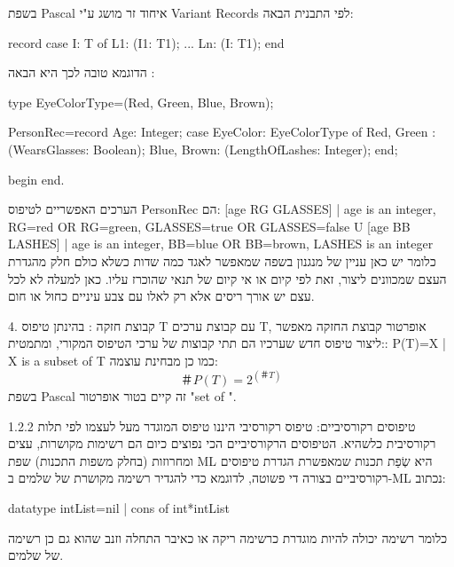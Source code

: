       בשפת Pascal איחוד זר מושג ע"י Variant Records לפי התבנית הבאה:
\begin{PASCAL}
record case I: T of
L1: (I1: T1);
...
Ln: (I: T1);
end
\end{PASCAL}

      הדוגמא טובה לכך היא הבאה :

\begin{PASCAL}
type
      EyeColorType=(Red, Green, Blue, Brown);

      PersonRec=record
        Age: Integer;
      case EyeColor: EyeColorType of
        Red, Green : (WearsGlasses: Boolean);
        Blue, Brown: (LengthOfLashes: Integer);
      end;

    begin
    end.
\end{PASCAL}

      הערכים האפשריים לטיפוס PersonRec הם:
      { [age RG GLASSES] | age is an integer, RG=red OR RG=green, GLASSES=true OR GLASSES=false} U { [age BB LASHES] | age is an integer, BB=blue OR BB=brown, LASHES is an integer}
      כלומר יש כאן עניין של מנגנון בשפה שמאפשר לאגד כמה שדות כשלא כולם חלק מהגדרת העצם שמכוונים ליצור, זאת לפי קיום או אי קיום של תנאי שהוכרז עליו. כאן למעלה לא לכל עצם יש אורך ריסים אלא רק לאלו עם צבע עיניים כחול או חום.

      4. קבוצת חזקה :
      בהינתן טיפוס T עם קבוצת ערכים T, אופרטור קבוצת החזקה מאפשר ליצור טיפוס חדש שערכיו הם תתי קבוצות של ערכי הטיפוס המקורי, ומתמטית::
      P(T)={X | X is a subset of T}
      כמו כן מבחינת עוצמה:
      \begin{equation}
        ＃P(T)=2^(＃T)
      \end{equation}
      בשפת Pascal זה קיים בטור אופרטור "set of ".

      1.2.2 טיפוסים רקורסיביים:
      טיפוס רקורסיבי היננו טיפוס המוגדר מעל לעצמו לפי תלות רקורסיבית כלשהיא.
      הטיפוסים הרקורסיביים הכי נפוצים כיום הם רשימות מקושרות, עצים ומחרוזות (בחלק משפות התכנות)
      שפת ML היא שְׂפַת תכנות שמאפשרת הגדרת טיפוסים רקורסיביים בצורה די פשוטה, לדוגמא כדי להגדיר רשימה מקושרת של שלמים ב-ML נכתוב:

      datatype intList=nil | cons of int*intList

      כלומר רשימה יכולה להיות מוגדרת כרשימה ריקה או כאיבר התחלה וזנב שהוא גם כן רשימה של שלמים.

